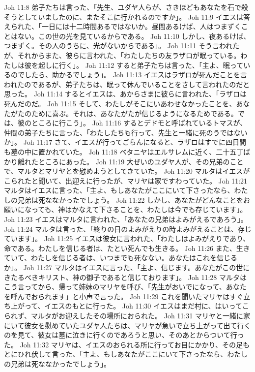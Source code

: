 Joh 11:8  弟子たちは言った、「先生、ユダヤ人らが、さきほどもあなたを石で殺そうとしていましたのに、またそこに行かれるのですか」。
Joh 11:9  イエスは答えられた、「一日には十二時間あるではないか。昼間あるけば、人はつまずくことはない。この世の光を見ているからである。
Joh 11:10  しかし、夜あるけば、つまずく。その人のうちに、光がないからである」。
Joh 11:11  そう言われたが、それからまた、彼らに言われた、「わたしたちの友ラザロが眠っている。わたしは彼を起しに行く」。
Joh 11:12  すると弟子たちは言った、「主よ、眠っているのでしたら、助かるでしょう」。
Joh 11:13  イエスはラザロが死んだことを言われたのであるが、弟子たちは、眠って休んでいることをさして言われたのだと思った。
Joh 11:14  するとイエスは、あからさまに彼らに言われた、「ラザロは死んだのだ。
Joh 11:15  そして、わたしがそこにいあわせなかったことを、あなたがたのために喜ぶ。それは、あなたがたが信じるようになるためである。では、彼のところに行こう」。
Joh 11:16  するとデドモと呼ばれているトマスが、仲間の弟子たちに言った、「わたしたちも行って、先生と一緒に死のうではないか」。
Joh 11:17  さて、イエスが行ってごらんになると、ラザロはすでに四日間も墓の中に置かれていた。
Joh 11:18  ベタニヤはエルサレムに近く、二十五丁ばかり離れたところにあった。
Joh 11:19  大ぜいのユダヤ人が、その兄弟のことで、マルタとマリヤとを慰めようとしてきていた。
Joh 11:20  マルタはイエスがこられたと聞いて、出迎えに行ったが、マリヤは家ですわっていた。
Joh 11:21  マルタはイエスに言った、「主よ、もしあなたがここにいて下さったなら、わたしの兄弟は死ななかったでしょう。
Joh 11:22  しかし、あなたがどんなことをお願いになっても、神はかなえて下さることを、わたしは今でも存じています」。
Joh 11:23  イエスはマルタに言われた、「あなたの兄弟はよみがえるであろう」。
Joh 11:24  マルタは言った、「終りの日のよみがえりの時よみがえることは、存じています」。
Joh 11:25  イエスは彼女に言われた、「わたしはよみがえりであり、命である。わたしを信じる者は、たとい死んでも生きる。
Joh 11:26  また、生きていて、わたしを信じる者は、いつまでも死なない。あなたはこれを信じるか」。
Joh 11:27  マルタはイエスに言った、「主よ、信じます。あなたがこの世にきたるべきキリスト、神の御子であると信じております」。
Joh 11:28  マルタはこう言ってから、帰って姉妹のマリヤを呼び、「先生がおいでになって、あなたを呼んでおられます」と小声で言った。
Joh 11:29  これを聞いたマリヤはすぐ立ち上がって、イエスのもとに行った。
Joh 11:30  イエスはまだ村に、はいってこられず、マルタがお迎えしたその場所におられた。
Joh 11:31  マリヤと一緒に家にいて彼女を慰めていたユダヤ人たちは、マリヤが急いで立ち上がって出て行くのを見て、彼女は墓に泣きに行くのであろうと思い、そのあとからついて行った。
Joh 11:32  マリヤは、イエスのおられる所に行ってお目にかかり、その足もとにひれ伏して言った、「主よ、もしあなたがここにいて下さったなら、わたしの兄弟は死ななかったでしょう」。
